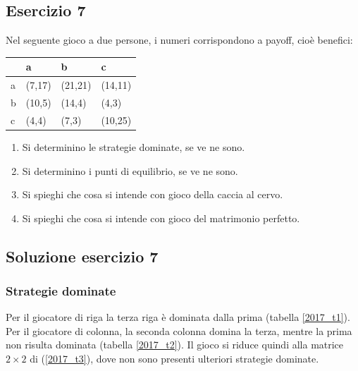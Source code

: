 \documentclass[\main/main.tex]{subfiles}
\begin{document}
\subsection{Esercizio 7}
Nel seguente gioco a due persone, i numeri corrispondono a payoff, cioè benefici:

\begin{table}
  \begin{tabular}{|L|L|L|L|}
    \hline
      & a      & b       & c       \\
    \hline
    a & (7,17) & (21,21) & (14,11) \\
    \hline
    b & (10,5) & (14,4)  & (4,3)   \\
    \hline
    c & (4,4)  & (7,3)   & (10,25) \\
    \hline
  \end{tabular}
\end{table}

\begin{enumerate}
  \item Si determinino le strategie dominate, se ve ne sono.
  \item Si determinino i punti di equilibrio, se ve ne sono.
  \item Si spieghi che cosa si intende con gioco della caccia al cervo.
  \item Si spieghi che cosa si intende con gioco del matrimonio perfetto.
\end{enumerate}

\subsection{Soluzione esercizio 7}

\subsubsection*{Strategie dominate}
Per il giocatore di riga la terza riga è dominata dalla prima (tabella \ref{2017_t1}). Per il giocatore di colonna, la seconda colonna domina la terza, mentre la prima non risulta dominata (tabella \ref{2017_t2}).
Il gioco si riduce quindi alla matrice $2 \times 2$ di (\ref{2017_t3}), dove non sono presenti ulteriori strategie dominate.
\end{document}
